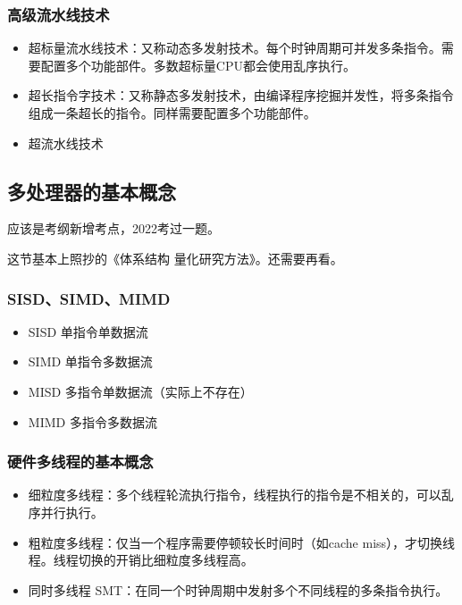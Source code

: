 \documentclass[12pt, a4paper, oneside]{ctexart}
\begin{document}
\subsubsection{高级流水线技术}

\begin{itemize}
  \item 超标量流水线技术：又称动态多发射技术。每个时钟周期可并发多条指令。需要配置多个功能部件。多数超标量CPU都会使用乱序执行。
  \item 超长指令字技术：又称静态多发射技术，由编译程序挖掘并发性，将多条指令组成一条超长的指令。同样需要配置多个功能部件。
  \item 超流水线技术
\end{itemize}

\subsection{多处理器的基本概念}

应该是考纲新增考点，2022考过一题。

这节基本上照抄的《体系结构 量化研究方法》。还需要再看。

\subsubsection{SISD、SIMD、MIMD}

\begin{itemize}
  \item SISD 单指令单数据流
  \item SIMD 单指令多数据流
  \item MISD 多指令单数据流（实际上不存在）
  \item MIMD 多指令多数据流
\end{itemize}

\subsubsection{硬件多线程的基本概念}

\begin{itemize}
  \item 细粒度多线程：多个线程轮流执行指令，线程执行的指令是不相关的，可以乱序并行执行。
  \item 粗粒度多线程：仅当一个程序需要停顿较长时间时（如cache miss），才切换线程。线程切换的开销比细粒度多线程高。
  \item 同时多线程 SMT：在同一个时钟周期中发射多个不同线程的多条指令执行。
\end{itemize}
\end{document}
